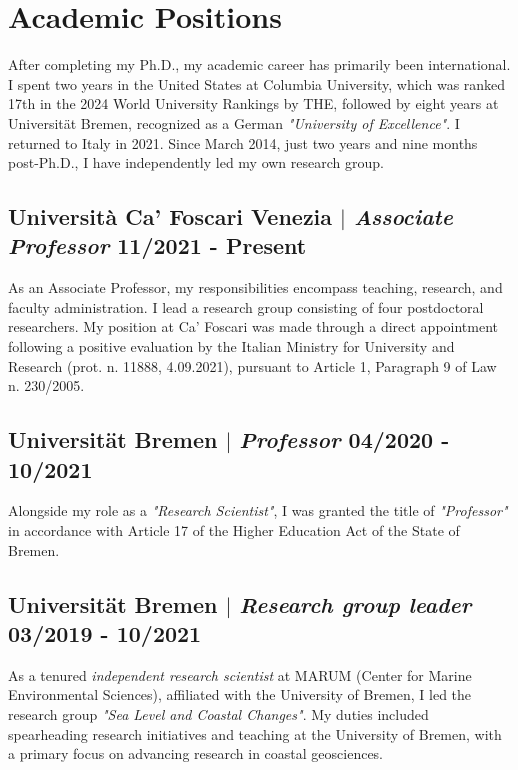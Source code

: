 \documentclass[11pt]{article}
\begin{document}
\section{Academic Positions}
{\normalfont After completing my Ph.D., my academic career has primarily been international. I spent two years in the United States at Columbia University, which was ranked 17th in the 2024 World University Rankings by THE, followed by eight years at Universität Bremen, recognized as a German \textit{"University of Excellence"}. I returned to Italy in 2021. Since March 2014, just two years and nine months post-Ph.D., I have independently led my own research group.}\\
\bigskip
\subsection{Università Ca' Foscari Venezia $|$ {\normalfont\textit{Associate Professor}} \hfill 11/2021 - Present}
{\footnotesize As an Associate Professor, my responsibilities encompass teaching, research, and faculty administration. I lead a research group consisting of four postdoctoral researchers. My position at Ca' Foscari was made through a direct appointment following a positive evaluation by the Italian Ministry for University and Research (prot. n. 11888, 4.09.2021), pursuant to Article 1, Paragraph 9 of Law n. 230/2005.}
\bigskip

\subsection{Universität Bremen $|$ {\normalfont\textit{Professor}} \hfill 04/2020 - 10/2021}
{\footnotesize Alongside my role as a \textit{"Research Scientist"}, I was granted the title of \textit{"Professor"} in accordance with Article 17 of the Higher Education Act of the State of Bremen.}
\bigskip

\subsection{Universität Bremen $|$ {\normalfont\textit{Research group leader}} \hfill 03/2019 - 10/2021}
{\footnotesize As a tenured \textit{independent research scientist} at MARUM (Center for Marine Environmental Sciences), affiliated with the University of Bremen, I led the research group \textit{"Sea Level and Coastal Changes"}. My duties included spearheading research initiatives and teaching at the University of Bremen, with a primary focus on advancing research in coastal geosciences.}
\bigskip
\end{document}
